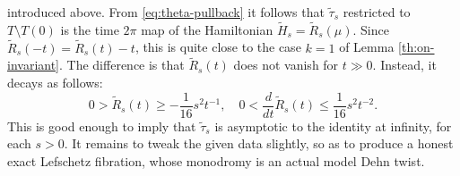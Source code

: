 \documentclass[10pt,letterpaper]{article}
\begin{document}
introduced above. From \eqref{eq:theta-pullback} it follows that
$\tilde{\tau}_s$ restricted to $T \setminus T(0)$ is the time $2\pi$ map of the
Hamiltonian $\tilde{H}_s = \tilde{R}_s(\mu)$. Since $\tilde{R}_s(-t) =
\tilde{R}_s(t) - t$, this is quite close to the case $k = 1$ of Lemma
\ref{th:on-invariant}. The difference is that $\tilde{R}_s(t)$ does not vanish
for $t \gg 0$. Instead, it decays as follows:
\begin{equation} \label{eq:decay}
 0 > \tilde{R}_s(t) \geq -\textstyle{\frac{1}{16}} s^2t^{-1}, \quad
 0 < \textstyle{\frac{d}{dt}}
 \tilde{R}_s(t) \leq \textstyle{\frac{1}{16}} s^2t^{-2}.
\end{equation}
This is good enough to imply that $\tilde{\tau}_s$ is asymptotic to the
identity at infinity, for each $s>0$. It remains to tweak the given data
slightly, so as to produce a honest exact Lefschetz fibration, whose monodromy
is an actual model Dehn twist.
\end{document}
